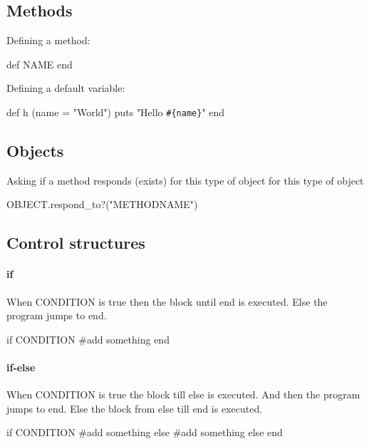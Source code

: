 \documentclass[10pt,a4paper]{scrartcl}
\begin{document}
\subsection{Methods} 

Defining a method:

\begin{terminalcode}
def NAME
end
\end{terminalcode}

\noindent Defining a default variable:

\begin{terminalcode}
def h (name = "World")
  puts "Hello \verb$#{name}$"
end
\end{terminalcode}

\subsection{Objects}

Asking if a method responds (exists) for this type of object for this type of object

\begin{terminalcode}
OBJECT.respond_to?("METHODNAME")
\end{terminalcode}



\subsection{Control structures}

\paragraph{if}
When CONDITION is true then the block until end is executed. Else the program jumps to end.
\begin{terminalcode}
if CONDITION
  #add something    
end
\end{terminalcode}
\paragraph{if-else}
When CONDITION is true the block till else is executed. And then the program jumps to end. Else the block from else till end is executed.
\begin{terminalcode}
if CONDITION
  #add something
else
  #add something else
end
\end{terminalcode}
\end{document}
